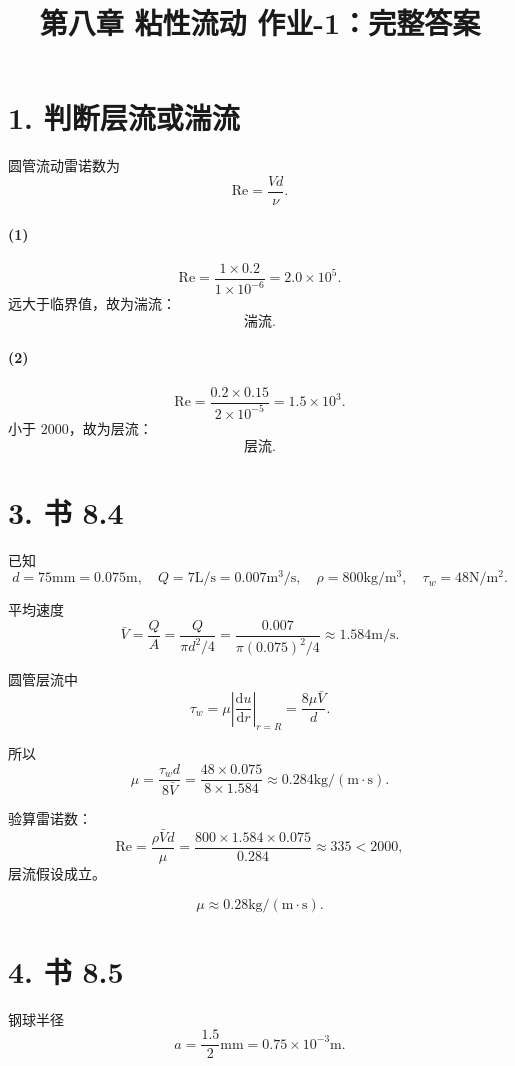 ﻿\documentclass[12pt,a4paper]{ctexart}
\title{第八章 粘性流动 作业-1：完整答案}
\author{}
\date{}
\newcommand{\Rey}{\mathrm{Re}}
\newcommand{\dd}{\mathrm d}
\begin{document}
\maketitle

\section*{1. 判断层流或湍流}

圆管流动雷诺数为
\[
\Rey=\frac{Vd}{\nu}.
\]

\paragraph{(1)}
\[
\Rey=\frac{1\times0.2}{1\times10^{-6}}
=2.0\times10^5.
\]
远大于临界值，故为湍流：
\[
\boxed{\text{湍流}}.
\]

\paragraph{(2)}
\[
\Rey=\frac{0.2\times0.15}{2\times10^{-5}}
=1.5\times10^3.
\]
小于 \(2000\)，故为层流：
\[
\boxed{\text{层流}}.
\]

\section*{3. 书 8.4}

已知
\[
d=75\mathrm{mm}=0.075\mathrm m,\quad
Q=7\mathrm{L/s}=0.007\mathrm{m^3/s},\quad
\rho=800\mathrm{kg/m^3},\quad
\tau_w=48\mathrm{N/m^2}.
\]

平均速度
\[
\bar V=\frac{Q}{A}
=\frac{Q}{\pi d^2/4}
=\frac{0.007}{\pi(0.075)^2/4}
\approx1.584\mathrm{m/s}.
\]

圆管层流中
\[
\tau_w=\mu\left|\frac{\dd u}{\dd r}\right|_{r=R}
=\frac{8\mu \bar V}{d}.
\]

所以
\[
\mu=\frac{\tau_w d}{8\bar V}
=\frac{48\times0.075}{8\times1.584}
\approx0.284\mathrm{kg/(m\cdot s)}.
\]

验算雷诺数：
\[
\Rey=\frac{\rho \bar V d}{\mu}
=\frac{800\times1.584\times0.075}{0.284}
\approx335<2000,
\]
层流假设成立。

\[
\boxed{\mu\approx0.28\mathrm{kg/(m\cdot s)}}.
\]

\section*{4. 书 8.5}

钢球半径
\[
a=\frac{1.5}{2}\mathrm{mm}=0.75\times10^{-3}\mathrm m.
\]
\end{document}
